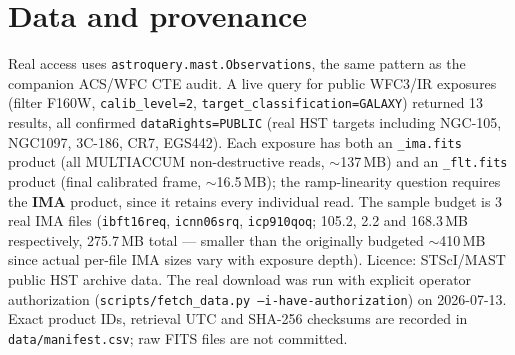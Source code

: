 \documentclass[11pt]{article}
\begin{document}
\section{Data and provenance}
\label{sec:data}
Real access uses \texttt{astroquery.mast.Observations}, the same pattern as
the companion ACS/WFC CTE audit. A live query for public WFC3/IR exposures
(filter F160W, \texttt{calib\_level=2}, \texttt{target\_classification=GALAXY})
returned 13 results, all confirmed \texttt{dataRights=PUBLIC} (real HST
targets including NGC-105, NGC1097, 3C-186, CR7, EGS442). Each exposure has
both an \texttt{\_ima.fits} product (all MULTIACCUM non-destructive reads,
$\sim$137\,MB) and an \texttt{\_flt.fits} product (final calibrated frame,
$\sim$16.5\,MB); the ramp-linearity question requires the \textbf{IMA}
product, since it retains every individual read. The sample budget is 3 real
IMA files (\texttt{ibft16req}, \texttt{icnn06srq}, \texttt{icp910qoq}; 105.2,
2.2 and 168.3\,MB respectively, 275.7\,MB total --- smaller than the
originally budgeted $\sim$410\,MB since actual per-file IMA sizes vary with
exposure depth). Licence: STScI/MAST public HST archive data. The real
download was run with explicit operator authorization
(\texttt{scripts/fetch\_data.py --i-have-authorization}) on 2026-07-13.
Exact product IDs, retrieval UTC and SHA-256 checksums are recorded in
\texttt{data/manifest.csv}; raw FITS files are not committed.
\end{document}
